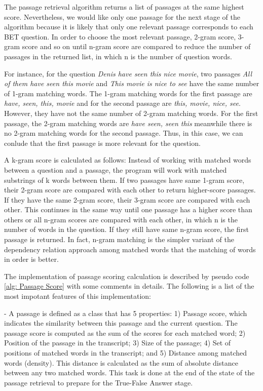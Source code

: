 The passage retrieval algorithm returns a list of passages at the same highest score. Nevertheless, we would like only one passage for the next stage of the algorithm because it is likely that only one relevant passage corresponds to each BET question. In order to choose the most relevant passage, 2-gram score, 3-gram score and so on until n-gram score are compared to reduce the number of passages in the returned list, in which n is the number of question words. 

For instance, for the question \textit{Denis have seen this nice movie}, two passages \textit{All of them have seen this movie } and \textit{This movie is nice to see} have the same number of 1-gram matching words. The 1-gram matching words for the first passage are \textit{have, seen, this, movie} and for the second passage are \textit{this, movie, nice, see}. However, they have not the same number of 2-gram matching words. For the first passage, the 2-gram matching words are \textit{have seen, seen this} meanwhile there is no 2-gram matching words for the second passage. Thus, in this case, we can conlude that the first passage is more relevant for the question. 

A k-gram score is calculated as follows: Instead of working with matched words between a question and  a passage, the program will work with matched substrings of k words between them. If two passages have same 1-gram score, their 2-gram score are compared with each other to return higher-score passages. If they have the same 2-gram score, their 3-gram score are compared with each other. This continues in the same way until one passage has a higher score than others or all n-gram scores are compared with each other, in which n is the number of words in the question. If they still have same n-gram score, the first passage is returned. In fact, n-gram matching is the simpler variant of the dependency relation approach among matched words that the matching of words in order is better.



The implementation of passage scoring calculation is described by pseudo code \ref{alg: Passage Score} with some comments in details. The following is a list of the most impotant features of this implementation:

- A passage is defined as a class that has 5 properties: 1) Passage score, which indicates the similarity between this passage and the current question. The passage score is computed as the sum of the scores for each matched word; 2) Position of the passage in the transcript; 3) Size of the passage; 4) Set of positions of matched words in the transcript; and 5) Distance among matched words (density). This distance is calculated as the sum of absolute distance between any two matched words. This task is done at the end of the state of the passage retrieval to prepare for the True-False Answer stage.


